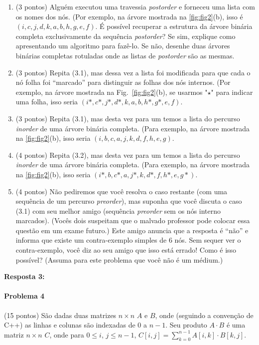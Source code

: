 \documentclass{article}
\begin{document}
\begin{enumerate}[label*=3.\arabic*.]
    \item (3 pontos) Alguém executou uma travessia \textit{postorder} e forneceu uma lista com os nomes dos nós. (Por exemplo, na árvore mostrada na \autoref{fig:fig2}(b), isso é $(i, c, j, d, k, a, b, h, g, e, f)$. É possível recuperar a estrutura da árvore binária completa exclusivamente da sequência \textit{postorder}? Se sim, explique como apresentando um algoritmo para fazê-lo. Se não, desenhe duas árvores binárias completas rotuladas onde as listas de \textit{postorder} são as mesmas.
    \item (3 pontos) Repita (3.1), mas dessa vez a lista foi modificada para que cada o nó folha foi “marcado” para distinguir as folhas dos nós internos. (Por exemplo, na árvore mostrada na Fig.~\ref{fig:fig2}(b), se usarmos "$\star$" para indicar uma folha, isso seria $(i*, c*, j*, d*, k, a, b, h*, g*, e, f)$.
    \item (3 pontos) Repita (3.1), mas desta vez para um temos a lista do percurso \textit{inorder} de uma árvore binária completa. (Para exemplo, na árvore mostrada na \autoref{fig:fig2}(b), isso seria $(i, b, c, a, j, k, d, f, h, e, g)$.
    \item (4 pontos) Repita (3.2), mas desta vez para um temos a lista do percurso \textit{inorder} de uma árvore binária completa. (Para exemplo, na árvore mostrada na \autoref{fig:fig2}(b), isso seria $(i*, b, c*, a, j*, k, d*, f, h*, e, g*)$. 
    \item (4 pontos) Não pediremos que você resolva o caso restante (com uma sequência de um percurso \textit{preorder}), mas suponha que você discuta o caso (3.1) com seu melhor amigo (sequência \textit{preorder} sem os nós interno marcados). (Vocês dois suspeitam que o malvado professor pode colocar essa questão em um exame futuro.) Este amigo anuncia que a resposta é “não” e informa que existe um contra-exemplo simples de 6 nós. Sem sequer ver o contra-exemplo, você diz ao seu amigo que isso está errado! Como é isso possível? (Assuma para este problema que você não é um médium.)
\end{enumerate}

\textbf{Resposta 3:}

\paragraph{Problema 4} (15 pontos) São dadas duas matrizes $n \times n$ $A$ e $B$, onde (seguindo a  convenção de C++) as linhas e colunas são indexadas de $0$ a $n-1$. Seu produto $A \cdot B$ é uma  matriz $n \times n$ $C$, onde para $0 \leq i$, $j \leq n-1$, $C[i,j]=\sum_{k=0}^{n-1}A[i,k]\cdot B[k,j]$.
\end{document}
